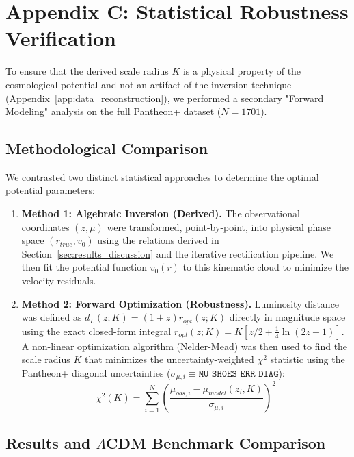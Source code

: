 \documentclass[11pt]{article}
\begin{document}
\section{Appendix C: Statistical Robustness Verification}
\label{app:robustness}

To ensure that the derived scale radius $K$ is a physical property of the cosmological potential and not an artifact of the inversion technique (Appendix~\ref{app:data_reconstruction}), we performed a secondary "Forward Modeling" analysis on the full Pantheon+ dataset ($N=1701$).

\subsection{Methodological Comparison}

We contrasted two distinct statistical approaches to determine the optimal potential parameters:

\begin{enumerate}
    \item \textbf{Method 1: Algebraic Inversion (Derived).} 
    The observational coordinates $(z, \mu)$ were transformed, point-by-point, into physical phase space $(r_{true}, v_0)$ using the relations derived in Section~\ref{sec:results_discussion} and the iterative rectification pipeline. We then fit the potential function $v_0(r)$ to this kinematic cloud to minimize the velocity residuals.
    
    \item \textbf{Method 2: Forward Optimization (Robustness).} 
    Luminosity distance was defined as $d_L(z; K) = (1+z)r_{opt}(z; K)$ directly in magnitude space using the exact closed-form integral $r_{opt}(z; K) = K[z/2 + \frac{1}{4}\ln(2z+1)]$. A non-linear optimization algorithm (Nelder-Mead) was then used to find the scale radius $K$ that minimizes the uncertainty-weighted $\chi^2$ statistic using the Pantheon+ diagonal uncertainties ($\sigma_{\mu,i} \equiv \texttt{MU\_SH0ES\_ERR\_DIAG}$):
    \begin{equation}
        \chi^2(K) = \sum_{i=1}^{N} \left( \frac{\mu_{obs, i} - \mu_{model}(z_i, K)}{\sigma_{\mu, i}} \right)^2
    \end{equation}
\end{enumerate}

\subsection{Results and $\Lambda$CDM Benchmark Comparison}
\end{document}
